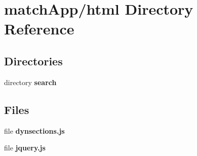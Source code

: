 \section{match\+App/html Directory Reference}
\label{dir_8009537940faad109011312025dbf55d}
\subsection*{Directories}
\begin{DoxyCompactItemize}
\item 
directory {\bf search}
\end{DoxyCompactItemize}
\subsection*{Files}
\begin{DoxyCompactItemize}
\item 
file {\bf dynsections.\+js}
\item 
file {\bf jquery.\+js}
\end{DoxyCompactItemize}

